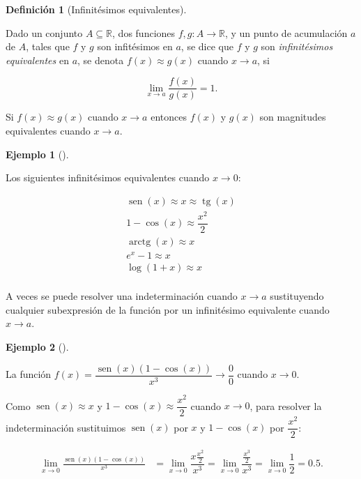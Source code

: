 \documentclass[
  a4paper,
]{scrreport}
\theoremstyle{definition}
\newtheorem{example}{Ejemplo}[chapter]
\theoremstyle{plain}
\theoremstyle{definition}
\newtheorem{definition}{Definición}[chapter]
\theoremstyle{definition}
\theoremstyle{plain}
\theoremstyle{plain}
\theoremstyle{remark}
\begin{document}
\begin{definition}[Infinitésimos
equivalentes]\protect\hypertarget{def-infinitesimos-equivalentes}{}\label{def-infinitesimos-equivalentes}

Dado un conjunto \(A\subseteq \mathbb{R}\), dos funciones
\(f,g:A\to \mathbb{R}\), y un punto de acumulación \(a\) de \(A\), tales
que \(f\) y \(g\) son infitésimos en \(a\), se dice que \(f\) y \(g\)
son \emph{infinitésimos equivalentes} en \(a\), se denota
\(f(x)\approx g(x)\) cuando \(x\to a\), si

\[\lim_{x\to a}\frac{f(x)}{g(x)}=1.\]

\end{definition}

Si \(f(x)\approx g(x)\) cuando \(x\to a\) entonces \(f(x)\) y \(g(x)\)
son magnitudes equivalentes cuando \(x\to a\).

\begin{example}[]\protect\hypertarget{exm-infinitesimos-equivalentes}{}\label{exm-infinitesimos-equivalentes}

Los siguientes infinitésimos equivalentes cuando \(x\to 0\):

\[
\begin{array}{c}
\operatorname{sen}(x) \approx x \approx \operatorname{tg}(x)\\
1-\cos(x) \approx \dfrac{x^2}{2}\\
\operatorname{arctg}(x) \approx x\\
e^x-1 \approx x\\
\log(1+x) \approx x\\
\end{array}
\]

\end{example}

A veces se puede resolver una indeterminación cuando \(x\to a\)
sustituyendo cualquier subexpresión de la función por un infinitésimo
equivalente cuando \(x\to a\).

\begin{example}[]\protect\hypertarget{exm-infinitesimo-equivalente}{}\label{exm-infinitesimo-equivalente}

La función
\(f(x)=\dfrac{\operatorname{sen}(x)(1- \cos(x))}{x^3}\to \dfrac{0}{0}\)
cuando \(x\to 0\).

Como \(\operatorname{sen}(x) \approx x\) y
\(1-\cos(x)\approx \dfrac{x^2}{2}\) cuando \(x\to 0\), para resolver la
indeterminación sustituimos \(\operatorname{sen}(x)\) por \(x\) y
\(1-\cos(x)\) por \(\dfrac{x^2}{2}\):

\begin{align*}
\lim_{x\to 0}\frac{\operatorname{sen}(x)(1- \cos (x))}{x^3}&=
\lim_{x\to 0}\dfrac{x\frac{x^2}{2}}{x^3} =
\lim_{x\to 0}\dfrac{\frac{x^3}{2}}{x^3} = \lim_{x\to 0}\dfrac{1}{2} =0.5.
\end{align*}

\end{example}
\end{document}
